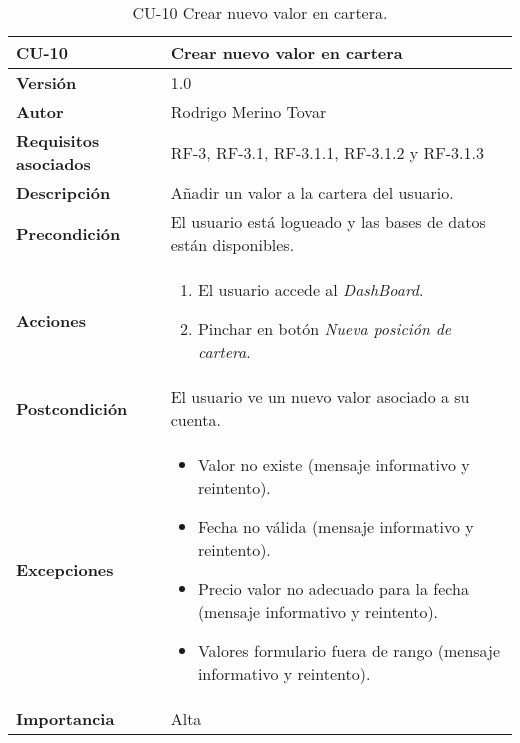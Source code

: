 \begin{table}[p]
	\centering
	\begin{tabularx}{\linewidth}{ p{} p{} }
		\toprule
		\textbf{CU-10}    & \textbf{Crear nuevo valor en cartera}\\
		\toprule
		\textbf{Versión}              & 1.0    \\
		\textbf{Autor}                & Rodrigo Merino Tovar \\
		\textbf{Requisitos asociados} & RF-3, RF-3.1, RF-3.1.1, RF-3.1.2 y RF-3.1.3  \\
		\textbf{Descripción}          & Añadir un valor a la cartera del usuario.\\
		\textbf{Precondición}         & El usuario está logueado y las bases de datos están disponibles.  \\
		\textbf{Acciones}             &
		\begin{enumerate}
			\def\labelenumi{\arabic{enumi}.}
			\tightlist
			\item El usuario accede al \emph{DashBoard}. 
			\item Pinchar en botón \emph{Nueva posición de cartera}.
		\end{enumerate}\\
		\textbf{Postcondición}        & El usuario ve un nuevo valor asociado a su cuenta. \\
		\textbf{Excepciones}          & 
		\begin{itemize}
			\tightlist
			\item Valor no existe (mensaje informativo y reintento).
			\item Fecha no válida (mensaje informativo y reintento).
			\item Precio valor no adecuado para la fecha (mensaje informativo y reintento).
			\item Valores formulario fuera de rango (mensaje informativo y reintento).
		\end{itemize} \\
		\textbf{Importancia}          & Alta \\
		\bottomrule
	\end{tabularx}
	\caption{CU-10 Crear nuevo valor en cartera.}
\end{table}


